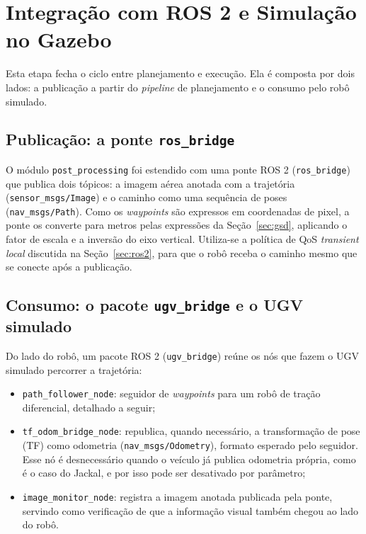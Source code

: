\documentclass[
    12pt,
    openright,
    oneside,
    a4paper,
    english,
    brazil
]{abntex2}
\begin{document}
\section{Integração com ROS 2 e Simulação no Gazebo}
\label{sec:ros_integracao}

Esta etapa fecha o ciclo entre planejamento e execução. Ela é composta por dois lados: a publicação a partir do \textit{pipeline} de planejamento e o consumo pelo robô simulado.

\subsection{Publicação: a ponte \texttt{ros\_bridge}}

O módulo \texttt{post\_processing} foi estendido com uma ponte ROS 2 (\texttt{ros\_bridge}) que publica dois tópicos: a imagem aérea anotada com a trajetória (\texttt{sensor\_msgs/Image}) e o caminho como uma sequência de poses (\texttt{nav\_msgs/Path}). Como os \textit{waypoints} são expressos em coordenadas de pixel, a ponte os converte para metros pelas expressões da Seção~\ref{sec:gsd}, aplicando o fator de escala e a inversão do eixo vertical. Utiliza-se a política de QoS \textit{transient local} discutida na Seção~\ref{sec:ros2}, para que o robô receba o caminho mesmo que se conecte após a publicação.

\subsection{Consumo: o pacote \texttt{ugv\_bridge} e o UGV simulado}

Do lado do robô, um pacote ROS 2 (\texttt{ugv\_bridge}) reúne os nós que fazem o UGV simulado percorrer a trajetória:

\begin{itemize}
    \item \texttt{path\_follower\_node}: seguidor de \textit{waypoints} para um robô de tração diferencial, detalhado a seguir;
    \item \texttt{tf\_odom\_bridge\_node}: republica, quando necessário, a transformação de pose (TF) como odometria (\texttt{nav\_msgs/Odometry}), formato esperado pelo seguidor. Esse nó é desnecessário quando o veículo já publica odometria própria, como é o caso do Jackal, e por isso pode ser desativado por parâmetro;
    \item \texttt{image\_monitor\_node}: registra a imagem anotada publicada pela ponte, servindo como verificação de que a informação visual também chegou ao lado do robô.
\end{itemize}
\end{document}
